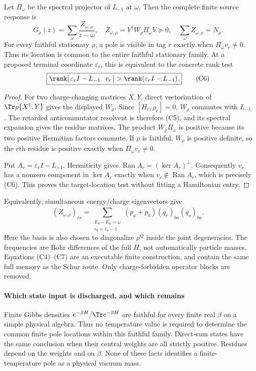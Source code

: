 \documentclass[12pt,a4paper]{article}
\begin{document}
\begin{theorem}
\label{p4:thm:v2168-faithful-stationary-poles}
Let $\Pi_\omega$ be the spectral projector of $L_{-1}$ at $\omega$.
Then the complete finite source response is
\[
 \boxed{G_\rho(z)=\sum_\omega\frac{Z_{\omega,\rho}}{z-\omega},
 \quad Z_{\omega,\rho}=V^\dagger W_\rho\Pi_\omega V\succeq0,
 \quad\sum_\omega Z_{\omega,\rho}=N_\rho.}
\]
For every faithful stationary $\rho$, a pole is visible in tag $r$ exactly
when $\Pi_\omega v_r\ne0$. Thus its location is common to the entire
faithful stationary family. At a proposed terminal coordinate
$\varepsilon_r$, this is equivalent to the concrete rank test
\[
 \boxed{
 \rank[\,\varepsilon_rI-L_{-1}\ \ v_r\,]
       >\rank(\varepsilon_rI-L_{-1}).}
 \tag{C6}
\]
\end{theorem}
\begin{proof}
For two charge-changing matrices $X,Y$, direct vectorization of
$\Tr\rho\{X^\dagger,Y\}$ gives the displayed $W_\rho$.
Since $[H_c,\rho_c]=0$, $W_\rho$ commutes with $L_{-1}$.
The retarded anticommutator resolvent is therefore (C5), and its spectral
expansion gives the residue matrices. The product
$W_\rho\Pi_\omega$ is positive because its two positive Hermitian factors
commute. If $\rho$ is faithful, $W_\rho$ is positive definite, so the
$r$th residue is positive exactly when $\Pi_\omega v_r\ne0$.

Put $A_r=\varepsilon_rI-L_{-1}$. Hermiticity gives
$\operatorname{Ran}A_r=(\ker A_r)^\perp$.
Consequently $v_r$ has a nonzero component in $\ker A_r$ exactly when
$v_r\notin\operatorname{Ran}A_r$, which is precisely (C6).
This proves the target-location test without fitting a Hamiltonian entry.
\end{proof}

Equivalently, simultaneous energy/charge eigenvectors give
\[
 (Z_{\omega,\rho})_{rs}
 =\sum_{\substack{E_b-E_a=\omega\\c_b=c_a-1}}
    (p_a+p_b)\overline{(q_r)_{ba}}(q_s)_{ba}.
 \tag{C7}
\]
Here the basis is also chosen to diagonalize $\rho^Q$ inside the joint
degeneracies. The frequencies are Bohr differences of the full $H$, not
automatically particle masses. Equations (C4)--(C7) are an executable
finite construction, and contain the same full memory as the Schur route.
Only charge-forbidden operator blocks are removed.



\paragraph{Which state input is discharged, and which remains}
Finite Gibbs densities $e^{-\beta H}/\Tr e^{-\beta H}$ are faithful for
every finite real $\beta$ on a simple physical algebra. Thus no temperature
value is required to determine the common finite pole locations within
this faithful family. Direct-sum states have the same conclusion when
their central weights are all strictly positive. Residues depend on the
weights and on $\beta$. None of these facts identifies a finite-temperature
pole as a physical vacuum mass.
\end{document}
